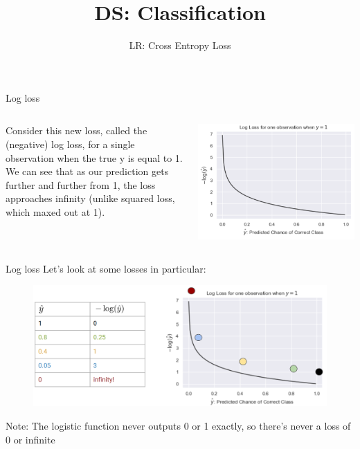 \documentclass[aspectratio=169]{../latex_main/tntbeamer}  %
\title[Cross Entropy Loss]{DS: Classification}
\subtitle{LR: Cross Entropy Loss}
\begin{document}
	
	\maketitle
	\begin{frame}{Log loss}
	    \begin{columns}
	        \begin{column}{.5\textwidth}
	                Consider this new loss, called the (negative) log loss, for a single observation when the true y is equal to 1.\\
	                \bigskip
	                We can see that as our prediction gets further and further from 1, the loss approaches infinity (unlike squared loss, which maxed out at 1).
	        \end{column}
	        
	        \begin{column}{.4\textwidth}
	                    
	                    \centering
	                    \includegraphics[scale=.5]{Bild18}
	        \end{column}
	    \end{columns}
	\end{frame}
	
	
	
	\begin{frame}{Log loss}
	    Let’s look at some losses in particular:
        \begin{figure}
            \centering
            \includegraphics[scale=.33]{Bild19}
        \end{figure}
	    Note: The logistic function never outputs 0 or 1 exactly, so there’s never a loss of  0 or infinite 
	\end{frame}
	
\end{document}
